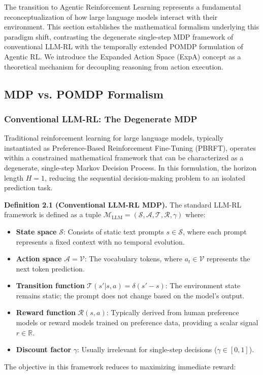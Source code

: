 The transition to Agentic Reinforcement Learning represents a fundamental reconceptualization of how large language models interact with their environment. This section establishes the mathematical formalism underlying this paradigm shift, contrasting the degenerate single-step MDP framework of conventional LLM-RL with the temporally extended POMDP formulation of Agentic RL. We introduce the Expanded Action Space (ExpA) concept as a theoretical mechanism for decoupling reasoning from action execution.

\subsection{MDP vs. POMDP Formalism}

\subsubsection{Conventional LLM-RL: The Degenerate MDP}

Traditional reinforcement learning for large language models, typically instantiated as Preference-Based Reinforcement Fine-Tuning (PBRFT), operates within a constrained mathematical framework that can be characterized as a degenerate, single-step Markov Decision Process. In this formulation, the horizon length $H = 1$, reducing the sequential decision-making problem to an isolated prediction task.

\textbf{Definition 2.1 (Conventional LLM-RL MDP).} The standard LLM-RL framework is defined as a tuple $\mathcal{M}_{\text{LLM}} = (\mathcal{S}, \mathcal{A}, \mathcal{T}, \mathcal{R}, \gamma)$ where:

\begin{itemize}
    \item \textbf{State space} $\mathcal{S}$: Consists of static text prompts $s \in \mathcal{S}$, where each prompt represents a fixed context with no temporal evolution.

    \item \textbf{Action space} $\mathcal{A} = \mathcal{V}$: The vocabulary tokens, where $a_t \in \mathcal{V}$ represents the next token prediction.

    \item \textbf{Transition function} $\mathcal{T}(s' | s, a) = \delta(s' - s)$: The environment state remains static; the prompt does not change based on the model's output.

    \item \textbf{Reward function} $\mathcal{R}(s, a)$: Typically derived from human preference models or reward models trained on preference data, providing a scalar signal $r \in \mathbb{R}$.

    \item \textbf{Discount factor} $\gamma$: Usually irrelevant for single-step decisions ($\gamma \in [0, 1]$).

\end{itemize}
The objective in this framework reduces to maximizing immediate reward:

